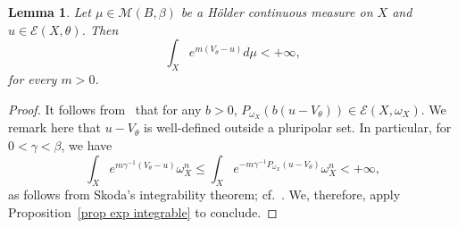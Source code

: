 \documentclass[a4paper,11pt]{amsart}
\numberwithin{equation}{section}
\newtheorem{lemma}[theorem]{Lemma}
\theoremstyle{definition}
\begin{document}
\begin{lemma}\label{lem integ phi-u} Let $\mu\in\mathcal{M}(B,\beta)$ be a H\"older continuous measure on $X$
	and $u\in\mathcal{E}(X, \theta)$.
	Then
		$$\int_Xe^{m(V_{\theta}-u)}d\mu<+\infty,$$
for every $m>0$.
 \end{lemma} 
 \begin{proof} 
     It follows from~\cite[Proposition 2.10]{dang2021continuity} that for any $b>0$, $P_{\omega_X}(b(u-V_\theta))\in\mathcal{E}(X,\omega_X)$. We remark here that $u-V_\theta$ is well-defined outside a pluripolar set. 
     In particular, for $0<\gamma<\beta$, we have
     \[\int_X e^{m\gamma^{-1}(V_\theta-u)}\omega_X^n\leq \int_X e^{-m\gamma^{-1}P_{\omega_X}(u-V_\theta)}\omega_X^n<+\infty, \]
     as follows from Skoda's integrability theorem; cf.~\cite[Theorem 2.50]{guedj2017degenerate}. We, therefore, apply Proposition~\ref{prop exp integrable} to conclude.
 \end{proof}
\end{document}
